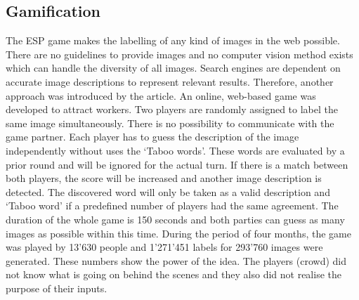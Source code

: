 \subsection{Gamification}
The ESP game\cite{esp} makes the labelling of any kind of images in the web possible. There are no guidelines to provide images and no computer vision method exists which can handle the diversity of all images. Search engines are dependent on accurate image descriptions to represent relevant results. Therefore, another approach was introduced by the article. An online, web-based game was developed to attract workers. Two players are randomly assigned to label the same image simultaneously. There is no possibility to communicate with the game partner. Each player has to guess the description of the image independently without uses the `Taboo words'. These words are evaluated by a prior round and will be ignored for the actual turn. If there is a match between both players, the score will be increased and another image description is detected. The discovered word will only be taken as a valid description and `Taboo word' if a predefined number of players had the same agreement. The duration of the whole game is 150 seconds and both parties can guess as many images as possible within this time. 
During the period of four months, the game was played by 13'630 people and 1'271'451 labels for 293'760 images were generated. These numbers show the power of the idea. The players (crowd) did not know what is going on behind the scenes and they also did not realise the purpose of their inputs.

